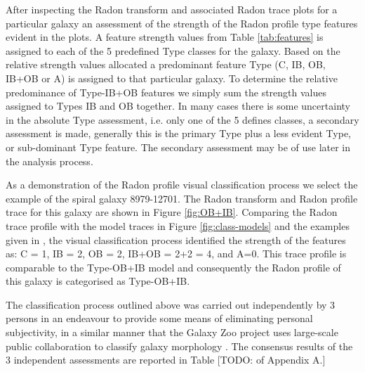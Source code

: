 After inspecting the Radon transform and associated Radon trace plots for a particular galaxy an assessment of the strength of the Radon profile type features evident in the plots. A feature strength values from Table \ref{tab:features} is assigned to each of the 5 predefined Type classes for the galaxy. Based on the relative strength values allocated a predominant feature Type (C, IB, OB, IB+OB or A) is assigned to that particular galaxy. To determine the relative predominance of Type-IB+OB features we simply sum the strength values assigned to Types IB and OB together. 
In many cases there is some uncertainty in the absolute Type assessment, i.e. only one of the 5 defines classes, a secondary assessment is made,  generally this is the primary Type plus a less evident Type, or sub-dominant Type feature. The secondary assessment may be of use later in the analysis process.

As a demonstration of the Radon profile visual classification process we select the example of the spiral galaxy 8979-12701. The Radon transform and Radon profile trace for this galaxy are shown in Figure \ref{fig:OB+IB}. Comparing the Radon trace profile with the model traces in Figure \ref{fig:class-models} and the examples given in  \citet[Figure 7 of][]{2018MNRAS.480.2217S}, the visual classification process identified the strength of the features as: C = 1, IB = 2, OB = 2, IB+OB = 2+2 = 4, and A=0. This trace profile is comparable to the Type-OB+IB model and consequently the Radon profile of this galaxy is categorised as Type-OB+IB.

The classification process outlined above was carried out independently by 3 persons in an endeavour to provide some means of eliminating personal subjectivity, in a similar manner that the Galaxy Zoo project uses large-scale public collaboration to classify galaxy morphology \citep{2017MNRAS.464.4176W}. The consensus results of the 3 independent assessments are reported in Table [TODO: of Appendix A.]

